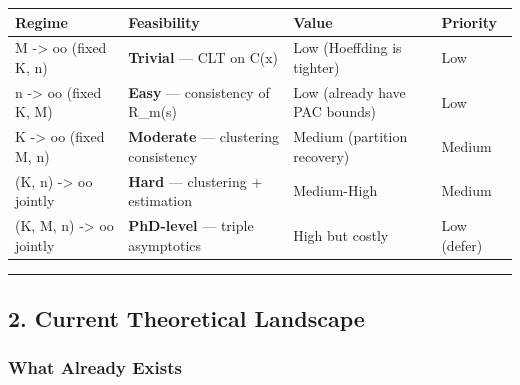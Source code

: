 \documentclass[
  12pt,
]{ctexart}
\begin{document}
\begin{longtable}[]{@{}
  >{\raggedright\arraybackslash}p{}
  >{\raggedright\arraybackslash}p{}
  >{\raggedright\arraybackslash}p{}
  >{\raggedright\arraybackslash}p{}@{}}
\toprule\noalign{}
\begin{minipage}[b]{\linewidth}\raggedright
Regime
\end{minipage} & \begin{minipage}[b]{\linewidth}\raggedright
Feasibility
\end{minipage} & \begin{minipage}[b]{\linewidth}\raggedright
Value
\end{minipage} & \begin{minipage}[b]{\linewidth}\raggedright
Priority
\end{minipage} \\
\midrule\noalign{}
\endhead
\bottomrule\noalign{}
\endlastfoot
M -\textgreater{} oo (fixed K, n) & \textbf{Trivial} --- CLT on C(x) &
Low (Hoeffding is tighter) & Low \\
n -\textgreater{} oo (fixed K, M) & \textbf{Easy} --- consistency of
R\_m(s) & Low (already have PAC bounds) & Low \\
K -\textgreater{} oo (fixed M, n) & \textbf{Moderate} --- clustering
consistency & Medium (partition recovery) & Medium \\
(K, n) -\textgreater{} oo jointly & \textbf{Hard} --- clustering +
estimation & Medium-High & Medium \\
(K, M, n) -\textgreater{} oo jointly & \textbf{PhD-level} --- triple
asymptotics & High but costly & Low (defer) \\
\end{longtable}

\begin{center}\rule{0.5\linewidth}{0.5pt}\end{center}

\subsection{2. Current Theoretical
Landscape}\label{current-theoretical-landscape}

\subsubsection{What Already Exists}\label{what-already-exists}
\end{document}
